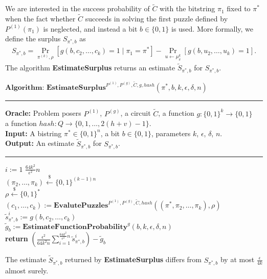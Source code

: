 We are interested in the success probability of $\widetilde{C}$ with the bitstring $\pi_1$ fixed to $\pi^*$ when
the fact whether $\widetilde{C}$ succeeds in solving the first puzzle defined by $P^{(1)}(\pi_1)$ is neglected, and
instead a bit $b \in \{0,1\}$ is used. More formally, we define the surplus $S_{\pi^*, b}$ as
\begin{align}
  \label{eq:s_pi_b}
S_{\pi^*, b} = \underset{\pi^{(k)}, \rho}{\Pr}\left[g(b, c_2, \dots, c_k) = 1 \mid \pi_1 = \pi^*\right] - \underset{u \leftarrow \mu^{k}_{\delta}}{\Pr}\left[g(b, u_2, \dots, u_k) = 1\right].
\end{align}
%
The algorithm \textbf{EstimateSurplus} returns an estimate $\widetilde{S}_{\pi^*, b}$ for $S_{\pi^*, b}$.
%
\begin{codeblock}
  $\textbf{Algorithm: EstimateSurplus}^{P^{(1)}, P^{(g)}, \widetilde{C}, g, hash}(\pi^*, b, k, \epsilon, \delta, n)$
  \medskip
  \hrule
  \medskip
  \textbf{Oracle:} Problem posers $P^{(1)}$, $P^{(g)}$, a circuit $\widetilde{C}$, a function $g: \{0,1\}^{k} \rightarrow \{0,1\}$ \\
  \IndII a function $hash : Q \rightarrow \{0,1,\dots, 2(h+v)-1\}$.\\
  \textbf{Input:} A bistring $\pi^* \in \{0,1\}^{n}$, a bit $b \in \{0,1\}$, parameters $k$, $\epsilon$, $\delta$, $n$.\\
  \textbf{Output:} An estimate $\widetilde{S}_{\pi^*, b}$ for $S_{\pi^*, b}$.
  \medskip\hrule\medskip
  \For $i:=1$ \To $\frac{64k^2}{\epsilon^2}n$ \Do \\
  \IndI $(\pi_{2}, \dots, \pi_k) \xleftarrow{\$} \{0,1\}^{(k-1)n}$\\
  \IndI $\rho \xleftarrow{\$} \{0,1\}^{*}$\\
  \IndI $(c_1, \dots, c_k) := \textbf{EvalutePuzzles}^{P^{(1)}, P^{(g)}, \widetilde{C}, hash}((\pi^*, \pi_2, \dots, \pi_k), \rho)$\\
  \IndI $\widetilde{s}_{\pi^*,b}^i := g(b, c_{2}, \dots, c_k)$\\
  $\widetilde{g}_b := \textbf{EstimateFunctionProbability}^{g}(b, k, \epsilon, \delta, n)$ \\
  \textbf{return} $\left(\frac{\epsilon^2}{64k^2n} \sum_{i=1}^{\frac{64k^2}{\epsilon^2} n} \widetilde{s}_{\pi^*,b}^i \right) - \widetilde{g}_b$\\
\end{codeblock}
%
\begin{lemma}
  \label{lemma:surplus_estimate}
The estimate $\widetilde{S}_{\pi^*,b}$ returned by \textbf{EstimateSurplus} differs from $S_{\pi^*, b}$ by at most $\frac{\epsilon}{4k}$ almost surely.
\end{lemma}


